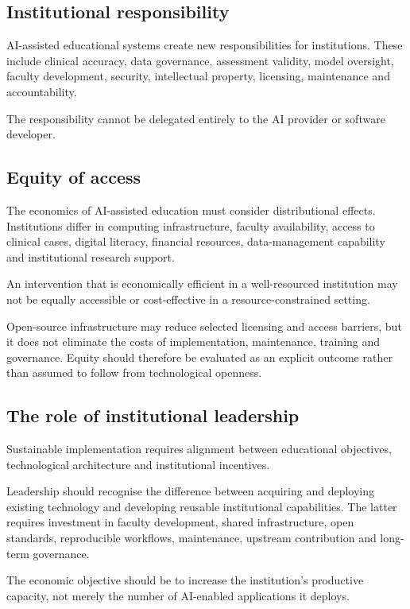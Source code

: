 \documentclass[11pt,a4paper]{article}
\begin{document}
\subsection{Institutional responsibility}
AI-assisted educational systems create new responsibilities for institutions. These include clinical accuracy, data governance, assessment validity, model oversight, faculty development, security, intellectual property, licensing, maintenance and accountability.

The responsibility cannot be delegated entirely to the AI provider or software developer.

\subsection{Equity of access}
The economics of AI-assisted education must consider distributional effects. Institutions differ in computing infrastructure, faculty availability, access to clinical cases, digital literacy, financial resources, data-management capability and institutional research support.

An intervention that is economically efficient in a well-resourced institution may not be equally accessible or cost-effective in a resource-constrained setting.

Open-source infrastructure may reduce selected licensing and access barriers, but it does not eliminate the costs of implementation, maintenance, training and governance. Equity should therefore be evaluated as an explicit outcome rather than assumed to follow from technological openness.

\subsection{The role of institutional leadership}
Sustainable implementation requires alignment between educational objectives, technological architecture and institutional incentives.

Leadership should recognise the difference between acquiring and deploying existing technology and developing reusable institutional capabilities. The latter requires investment in faculty development, shared infrastructure, open standards, reproducible workflows, maintenance, upstream contribution and long-term governance.

The economic objective should be to increase the institution's productive capacity, not merely the number of AI-enabled applications it deploys.
\end{document}
